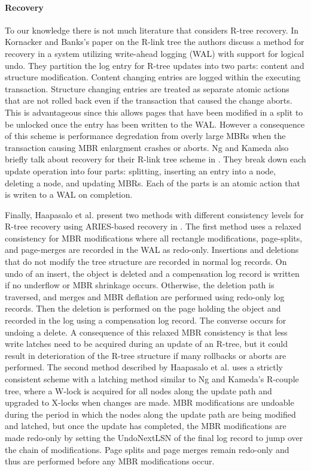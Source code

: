 \paragraph{Recovery} To our knowledge there is not much literature that considers
R-tree recovery. In Kornacker and Banks's paper on the R-link tree 
\cite{kornacker1995high} the authors discuss a method for recovery in a system 
utilizing write-ahead logging (WAL) with support for logical undo. They partition the 
log entry for R-tree updates into two parts: content and structure modification. 
Content changing entries are logged within the executing transaction. Structure 
changing entries are treated as separate atomic actions that are not rolled back 
even if the transaction that caused the change aborts. This is advantageous since
this allows pages that have been modified in a split to be unlocked once the entry
has been written to the WAL. However a consequence of this scheme is performance
degredation from overly large MBRs when the transaction causing MBR enlargment 
crashes or aborts. Ng and Kameda also briefly talk about recovery for their R-link
tree scheme in \cite{ng1994r}. They break down each update operation into four parts:
splitting, inserting an entry into a node, deleting a node, and updating MBRs. Each
of the parts is an atomic action that is writen to a WAL on completion. 

Finally, Haapasalo et al. present two methods with different consistency levels 
for R-tree recovery using ARIES-based recovery \cite{mohan1992aries} in 
\cite{haapasalo2013recovery}. The first method uses a relaxed consistency 
for MBR modifications where all rectangle modifications, page-splits, and 
page-merges are recorded in the WAL as redo-only. 
Insertions and deletions that do not modify the tree structure are recorded in 
normal log records. On undo of an insert, the object is deleted and a compensation
log record is written if no underflow or MBR shrinkage occurs. Otherwise, the deletion
path is traversed, and merges and MBR deflation are performed using redo-only log 
records. Then the deletion is performed on the page holding the object and recorded
in the log using a compensation log record. The converse occurs for undoing a delete.
A consequence of this relaxed MBR consistency is that less write latches need to be
acquired during an update of an R-tree, but it could result in deterioration of the 
R-tree structure if many rollbacks or aborts are performed. The second method 
described by Haapasalo et al. uses a strictly consistent scheme with a latching 
method similar to Ng and Kameda's R-couple tree\cite{ng1993concurrent}, where 
a W-lock is acquired for all nodes along the update path and upgraded to X-locks 
when changes are made. MBR modifications are undoable during the period in 
which the nodes along the update path are being modified and latched, but once 
the update has completed, the MBR modifications are made redo-only by setting 
the UndoNextLSN of the final log record to jump over the chain of modifications. 
Page splits and page merges remain redo-only and thus are performed before 
any MBR modifications occur. 

